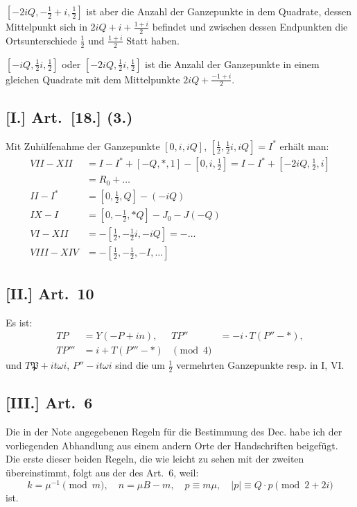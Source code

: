 \documentclass[12pt,a4paper]{article}
\begin{document}
$[-2iQ, -\frac{1}{2} + i, \frac{1}{2}]$ ist aber die Anzahl der Ganzepunkte in dem Quadrate, dessen Mittelpunkt sich in $2iQ + i + \frac{1+i}{2}$ befindet und zwischen dessen Endpunkten die Ortsunterschiede $\frac{1}{2}$ und $\frac{1+i}{2}$ Statt haben.

$[-iQ, \frac{1}{2}i, \frac{1}{2}]$ oder $[-2iQ, \frac{1}{2}i, \frac{1}{2}]$ ist die Anzahl der Ganzepunkte in einem gleichen Quadrate mit dem Mittelpunkte $2iQ + \frac{-1+i}{2}$.

\subsection*{[I.] Art.~[18.] (3.)}

Mit Zuhülfenahme der Ganzepunkte $[0, i, iQ]$, $[\frac{1}{2}, \frac{1}{2}i, iQ] = I^*$ erhält man:
\begin{align*}
VII - XII &= I - I^* + [-Q, *, 1] - [0, i, \frac{1}{2}] = I - I^* + [-2iQ, \frac{1}{2}, i]\\
&= R_0 + \ldots\\
II - I^* &= [0, \frac{1}{2}, Q] - (-iQ)\\
IX - I &= [0, -\frac{1}{2}, *Q] - J_0 - J(-Q)\\
VI - XII &= -[\frac{1}{2}, -\frac{1}{2}i, -iQ] = -\ldots\\
VIII - XIV &= -[\frac{1}{2}, -\frac{1}{2}, -I, \ldots]
\end{align*}

\subsection*{[II.] Art.~10}

Es ist:
\begin{align*}
TP &= Y(-P + in), & TP'' &= -i \cdot T(P'' - *),\\
TP''' &= i + T(P''' - *) &\pmod{4}
\end{align*}
und $T\mathfrak{P} + it\omega i$, $P'' - it\omega i$ sind die um $\frac{1}{2}$ vermehrten Ganzepunkte resp. in I, VI.

\subsection*{[III.] Art.~6}

Die in der Note angegebenen Regeln für die Bestimmung des Dec. habe ich der vorliegenden Abhandlung aus einem andern Orte der Handschriften beigefügt. Die erste dieser beiden Regeln, die wie leicht zu sehen mit der zweiten übereinstimmt, folgt aus der des Art.~6, weil:
\[
k = \mu^{-1} \pmod{m}, \quad n = \mu B - m, \quad p \equiv m\mu, \quad |p| \equiv Q \cdot p \pmod{2+2i}
\]
ist.
\end{document}

